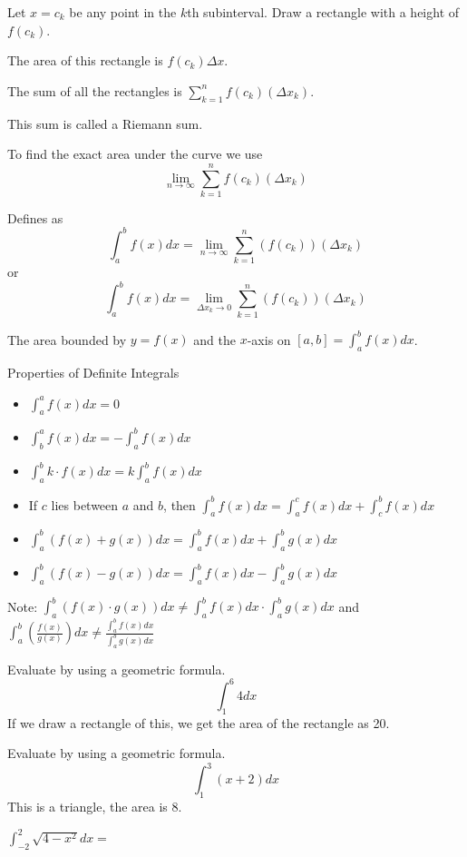 \documentclass[../bccalc.tex]{subfiles}
\begin{document}
Let $x=c_k$ be any point in the $k$th subinterval. Draw a rectangle with a height of $f(c_k)$.

The area of this rectangle is $f(c_k)\Delta x$.

The sum of all the rectangles is $\sum_{k=1}^n f(c_k)(\Delta x_k)$.

This sum is called a Riemann sum.

To find the exact area under the curve we use 
\[ \lim_{n\to \infty} \sum_{k=1}^n f(c_k)(\Delta x_k) \]

\begin{definition}
    Defines as 
    \[ \int_a^b f(x)dx = \lim_{n\to \infty}\sum_{k=1}^n (f(c_k))(\Delta x_k) \]
    or 
    \[ \int_a^b f(x)dx=\lim_{\Delta x_k \to 0}\sum_{k=1}^n (f(c_k))(\Delta x_k) \]
\end{definition}

The area bounded by $y=f(x)$ and the $x$-axis on $[a,b]=\int_a^b f(x)dx$.

Properties of Definite Integrals 
\begin{itemize}
    \item $\int_a^a f(x)dx=0$
    \item $\int_b^a f(x)dx=-\int_a^b f(x)dx$
    \item $\int_a^b k\cdot f(x)dx=k\int_a^b f(x)dx$
    \item If $c$ lies between $a$ and $b$, then $\int_a^b f(x)dx=\int_a^c f(x)dx+\int_c^b f(x)dx$
    \item $\int_a^b (f(x)+g(x))dx=\int_a^b f(x)dx+\int_a^b g(x)dx$
    \item $\int_a^b (f(x)-g(x))dx=\int_a^b f(x)dx-\int_a^b g(x)dx$
\end{itemize}

Note: $\int_a^b (f(x)\cdot g(x))dx\neq \int_a^b f(x)dx\cdot \int_a^b g(x)dx$ and $\int_a^b \left(\frac{f(x)}{g(x)}\right)dx\neq \frac{\int_a^b f(x)dx}{\int_a^b g(x)dx}$
\pagebreak
\begin{example}
    Evaluate by using a geometric formula.
    \[ \int_1^6 4 dx \]
    If we draw a rectangle of this, we get the area of the rectangle as 20.
\end{example}

\begin{example}
    Evaluate by using a geometric formula.
    \[ \int_1^3 (x+2)dx \]
    This is a triangle, the area is 8.
\end{example}

\ex $\int_{-2}^2 \sqrt{4-x^2}dx = $
\end{document}
